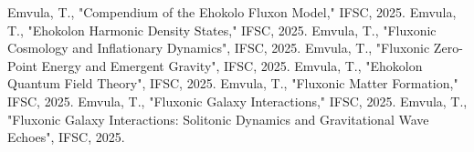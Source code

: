 \documentclass[11pt]{article}
\begin{document}
\begin{thebibliography}{9} %
 Emvula, T., "Compendium of the Ehokolo Fluxon Model," IFSC, 2025.
 Emvula, T., "Ehokolon Harmonic Density States," IFSC, 2025.
 Emvula, T., "Fluxonic Cosmology and Inflationary Dynamics", IFSC, 2025.
 Emvula, T., "Fluxonic Zero-Point Energy and Emergent Gravity", IFSC, 2025.
 Emvula, T., "Ehokolon Quantum Field Theory", IFSC, 2025.
 Emvula, T., "Fluxonic Matter Formation," IFSC, 2025. %
 Emvula, T., "Fluxonic Galaxy Interactions," IFSC, 2025. %
 Emvula, T., "Fluxonic Galaxy Interactions: Solitonic Dynamics and Gravitational Wave Echoes", IFSC, 2025.
\end{thebibliography}
\end{document}
